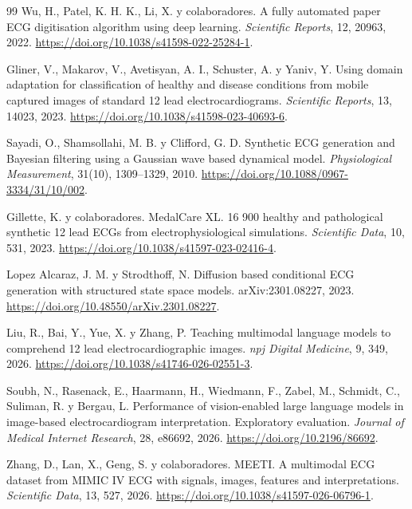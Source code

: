 \begin{thebibliography}{99}
Wu, H., Patel, K. H. K., Li, X. y colaboradores.
\newblock A fully automated paper ECG digitisation algorithm using deep learning.
\newblock \emph{Scientific Reports}, 12, 20963, 2022.
\newblock \url{https://doi.org/10.1038/s41598-022-25284-1}.

Gliner, V., Makarov, V., Avetisyan, A. I., Schuster, A. y Yaniv, Y.
\newblock Using domain adaptation for classification of healthy and disease conditions from mobile captured images of standard 12 lead electrocardiograms.
\newblock \emph{Scientific Reports}, 13, 14023, 2023.
\newblock \url{https://doi.org/10.1038/s41598-023-40693-6}.

Sayadi, O., Shamsollahi, M. B. y Clifford, G. D.
\newblock Synthetic ECG generation and Bayesian filtering using a Gaussian wave based dynamical model.
\newblock \emph{Physiological Measurement}, 31(10), 1309--1329, 2010.
\newblock \url{https://doi.org/10.1088/0967-3334/31/10/002}.

Gillette, K. y colaboradores.
\newblock MedalCare XL. 16 900 healthy and pathological synthetic 12 lead ECGs from electrophysiological simulations.
\newblock \emph{Scientific Data}, 10, 531, 2023.
\newblock \url{https://doi.org/10.1038/s41597-023-02416-4}.

Lopez Alcaraz, J. M. y Strodthoff, N.
\newblock Diffusion based conditional ECG generation with structured state space models.
\newblock arXiv:2301.08227, 2023.
\newblock \url{https://doi.org/10.48550/arXiv.2301.08227}.

Liu, R., Bai, Y., Yue, X. y Zhang, P.
\newblock Teaching multimodal language models to comprehend 12 lead electrocardiographic images.
\newblock \emph{npj Digital Medicine}, 9, 349, 2026.
\newblock \url{https://doi.org/10.1038/s41746-026-02551-3}.

Soubh, N., Rasenack, E., Haarmann, H., Wiedmann, F., Zabel, M., Schmidt, C., Suliman, R. y Bergau, L.
\newblock Performance of vision-enabled large language models in image-based electrocardiogram interpretation. Exploratory evaluation.
\newblock \emph{Journal of Medical Internet Research}, 28, e86692, 2026.
\newblock \url{https://doi.org/10.2196/86692}.

Zhang, D., Lan, X., Geng, S. y colaboradores.
\newblock MEETI. A multimodal ECG dataset from MIMIC IV ECG with signals, images, features and interpretations.
\newblock \emph{Scientific Data}, 13, 527, 2026.
\newblock \url{https://doi.org/10.1038/s41597-026-06796-1}.


\end{thebibliography}

